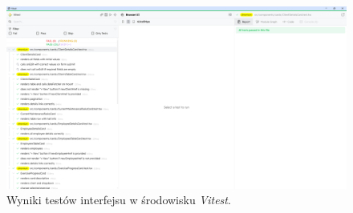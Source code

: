 \documentclass[../../spr.tex]{subfiles}
\begin{document}
\begin{figure}[H]
  \centering
  \includegraphics[width=\textwidth]{img/test.png}
  \caption{Wyniki testów interfejsu w środowisku \textit{Vitest}.}
\end{figure}
\end{document}
